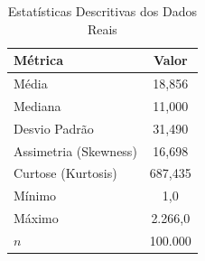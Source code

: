\begin{table}[H]
\centering
\small
\caption{Estatísticas Descritivas dos Dados Reais}
\label{tab:estatisticas_descritivas}
\begin{tabular}{lc}
\toprule
\textbf{Métrica} & \textbf{Valor} \\
\midrule
Média & 18,856 \\
Mediana & 11,000 \\
Desvio Padrão & 31,490 \\
Assimetria (Skewness) & 16,698 \\
Curtose (Kurtosis) & 687,435 \\
Mínimo & 1,0 \\
Máximo & 2.266,0 \\
$n$ & 100.000 \\
\bottomrule
\end{tabular}
\end{table}